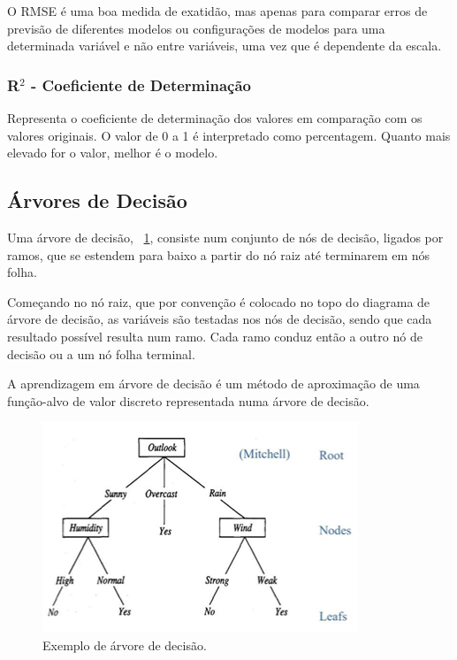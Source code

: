 \documentclass[conference]{IEEEtran}
\begin{document}
O RMSE é uma boa medida de exatidão, mas apenas para comparar erros de previsão de diferentes modelos ou configurações de modelos para uma determinada variável e não entre variáveis, uma vez que é dependente da escala. 

\medskip
\subsubsection{R$^2$ - Coeficiente de Determinação}

Representa o coeficiente de determinação dos valores em comparação com os valores originais. O valor de 0 a 1 é interpretado como percentagem. Quanto mais elevado for o valor, melhor é o modelo.\cite{madureira2024cv} 


\subsection{Árvores de Decisão}

Uma árvore de decisão,  \figurename~\ref{fig:Decision_Trees_example},  consiste num conjunto de nós de decisão, ligados por ramos, que se estendem para baixo a partir do nó raiz até terminarem em nós folha. 

Começando no nó raiz, que por convenção é colocado no topo do diagrama de árvore de decisão, as variáveis são testadas nos nós de decisão, sendo que cada resultado possível resulta num ramo. Cada ramo conduz então a outro nó de decisão ou a um nó folha terminal. 

A aprendizagem em árvore de decisão é um método de aproximação de uma função-alvo de valor discreto representada numa árvore de decisão. \cite{madureira2024dt}

\begin{figure}[h]
	\centering
	\includegraphics[width=0.9\linewidth]{Decision_Trees_example}
	\caption{Exemplo de árvore de decisão. \cite{madureira2024dt}}
	\label{fig:Decision_Trees_example}
\end{figure}
\end{document}
